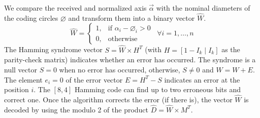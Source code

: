 We compare the received and normalized axis $\vec{\alpha}$ with the nominal diameters of the coding circles $\varnothing$ and transform them into a binary vector $\widehat{W}$.
\begin{equation}
\widehat{W}=
\begin{cases}
  1, & \text{if } \alpha_{i}-\diameter_{i} > 0 \\
  0, & \text{otherwise}
\end{cases} \enspace \forall i=1,\ldots, n
\end{equation}
The Hamming syndrome vector $S=\widehat{W}\times H^{T}$ (with $H=[1-I_{k}\mid I_{k}]$ as the parity-check matrix) indicates whether an error has occurred. The syndrome is a null vector $S=0$ when no error has occurred, otherwise, $S\neq 0$ and $\widehat{W}=W+E$. The element $e_{i}=0$ of the error vector $E=H^{T}-S$ indicates an error at the position $i$. The $[8,4]$ Hamming code can find up to two erroneous bits and correct one. Once the algorithm corrects the error (if there is), the vector $\widehat{W}$ is decoded by using the modulo 2 of the product $\widehat{D}=\widehat{W}\times M^{T}$. 

